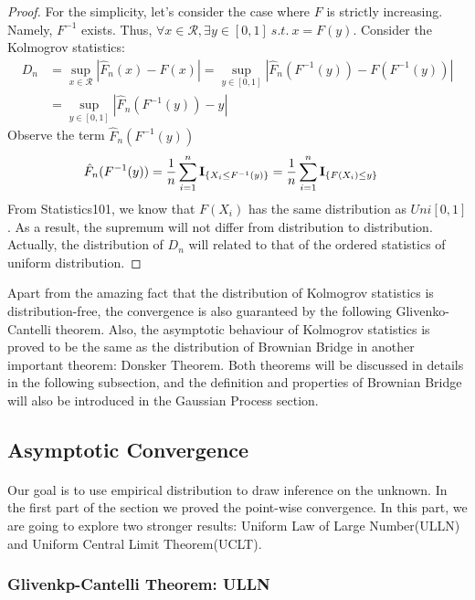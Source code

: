 \documentclass[final_project_1.tex]{subfiles}
\begin{document}
\begin{proof}
For the simplicity, let's consider the case where $F$ is strictly increasing. Namely, $F^{-1}$ exists. Thus, $\forall x \in \mathcal{R}, \exists y\in[0,1]\ s.t.\ x=F(y)$. Consider the Kolmogrov statistics:
\begin{align*}
D_n&=\sup_{x\in\mathcal{R}}|\hat{F}_n(x)-F(x)| = \sup_{y\in[0,1]}|\hat{F}_n(F^{-1}(y))-F(F^{-1}(y))|\\
&=\sup_{y\in[0,1]}|\hat{F}_n(F^{-1}(y))-y|
\end{align*}
Observe the term $\hat{F}_n(F^{-1}(y))$
\begin{align*}
\hat{F}_n(F^{-1}(y))&=\frac{1}{n}\sum^{n}_{i=1}{\bf I}_{\{X_i\leq F^{-1}(y)\}}=\frac{1}{n}\sum^{n}_{i=1}{\bf I}_{\{F(X_i)\leq y\}}
\end{align*}
From Statistics101, we know that $F(X_i)$ has the same distribution as $Uni[0,1]$. As a result, the supremum will not differ from distribution to distribution. Actually, the distribution of $D_n$ will related to that of the ordered statistics of uniform distribution.
\end{proof}

Apart from the amazing fact that the distribution of Kolmogrov statistics is distribution-free, the convergence is also guaranteed by the following Glivenko-Cantelli theorem. Also, the asymptotic behaviour of Kolmogrov statistics is proved to be the same as the distribution of Brownian Bridge in another important theorem: Donsker Theorem. Both theorems will be discussed in details in the following subsection, and the definition and properties of Brownian Bridge will also be introduced in the Gaussian Process section.


\subsection{Asymptotic Convergence}
\paragraph{}
Our goal is to use empirical distribution to draw inference on the unknown. In the first part of the section we proved the point-wise convergence. In this part, we are going to explore two stronger results: Uniform Law of Large Number(ULLN) and Uniform Central Limit Theorem(UCLT).
\subsubsection{Glivenkp-Cantelli Theorem: ULLN}
\end{document}
